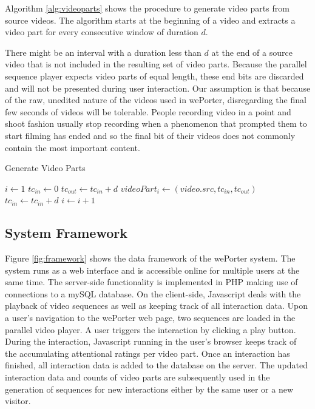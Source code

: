 Algorithm \ref{alg:videoparts} shows the procedure to generate video parts from source videos. The algorithm starts at the beginning of a video and extracts a video part for every consecutive window of duration $d$. 

There might be an interval with a duration less than $d$ at the end of a source video that is not included in the resulting set of video parts. Because the parallel sequence player expects video parts of equal length, these end bits are discarded and will not be presented during user interaction. Our assumption is that because of the raw, unedited nature of the videos used in wePorter, disregarding the final few seconds of videos will be tolerable. People recording video in a point and shoot fashion usually stop recording when a phenomenon that prompted them to start filming has ended and so the final bit of their videos does not commonly contain the most important content.

\begin{algorithm}
  \caption{Generate Video Parts}
  \begin{algorithmic}[1]
      \State $i\gets 1$
        \State $tc_{in} \gets 0$
          \State $tc_{out} \gets tc_{in}+d$
          \State $videoPart_i \gets (video.src, tc_{in}, tc_{out})$ 
          \State $tc_{in} \gets tc_{in}+d$
          \State $i \gets i+1$
        \EndWhile
      \EndFor
    \EndProcedure
  \end{algorithmic}
  \label{alg:videoparts}
\end{algorithm}

\subsection{System Framework}

Figure \ref{fig:framework} shows the data framework of the wePorter system. The system runs as a web interface and is accessible online for multiple users at the same time. The server-side functionality is implemented in PHP making use of connections to a mySQL database. On the client-side, Javascript deals with the playback of video sequences as well as keeping track of all interaction data. Upon a user's navigation to the wePorter web page, two sequences are loaded in the parallel video player. A user triggers the interaction by clicking a play button. During the interaction, Javascript running in the user's browser keeps track of the accumulating attentional ratings per video part. Once an interaction has finished, all interaction data is added to the database on the server. The updated interaction data and counts of video parts are subsequently used in the generation of sequences for new interactions either by the same user or a new visitor.

